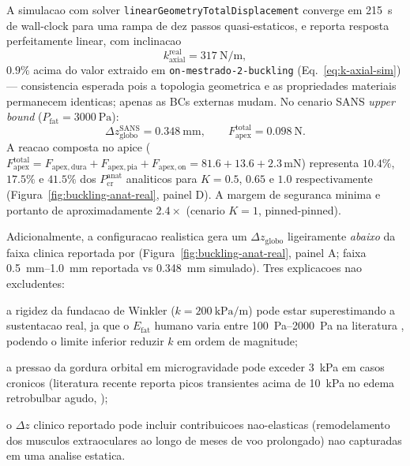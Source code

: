 A simulacao com solver \texttt{linearGeometryTotalDisplacement} converge em \SI{215}{\second} de wall-clock para uma rampa de dez passos quasi-estaticos, e reporta resposta perfeitamente linear, com inclinacao
\begin{equation}
  k_{\mathrm{axial}}^{\mathrm{real}} = \SI{317}{\newton\per\meter},
  \label{eq:k-axial-real}
\end{equation}
$0.9\%$ acima do valor extraido em \texttt{on-mestrado-2-buckling} (Eq.~\ref{eq:k-axial-sim}) --- consistencia esperada pois a topologia geometrica e as propriedades materiais permanecem identicas; apenas as BCs externas mudam. No cenario SANS \emph{upper bound} ($P_{\mathrm{fat}} = \SI{3000}{\pascal}$):
\begin{equation}
  \Delta z_{\mathrm{globo}}^{\mathrm{SANS}} = \SI{0.348}{\milli\meter},
  \qquad
  F_{\mathrm{apex}}^{\mathrm{total}} = \SI{0.098}{\newton}.
  \label{eq:resposta-SANS-real}
\end{equation}
A reacao composta no apice ($F_{\mathrm{apex}}^{\mathrm{total}} = F_{\mathrm{apex,dura}} + F_{\mathrm{apex,pia}} + F_{\mathrm{apex,on}} = 81.6 + 13.6 + 2.3\,\si{\milli\newton}$) representa $10.4\%$, $17.5\%$ e $41.5\%$ dos $P_{\mathrm{cr}}^{\mathrm{anat}}$ analiticos para $K = 0.5$, $0.65$ e $1.0$ respectivamente (Figura~\ref{fig:buckling-anat-real}, painel D). A margem de seguranca minima e portanto de aproximadamente $2.4\times$ (cenario $K = 1$, pinned-pinned).

Adicionalmente, a configuracao realistica gera um $\Delta z_{\mathrm{globo}}$ ligeiramente \emph{abaixo} da faixa clinica reportada por \citet{Lee2020NPJ} (Figura~\ref{fig:buckling-anat-real}, painel A; faixa \SIrange{0.5}{1.0}{\milli\meter} reportada vs \SI{0.348}{\milli\meter} simulado). Tres explicacoes nao excludentes:
\begin{enumerate*}[label=(\roman*)]
\item a rigidez da fundacao de Winkler ($k = \SI{200}{\kilo\pascal\per\meter}$) pode estar superestimando a sustentacao real, ja que o $E_{\mathrm{fat}}$ humano varia entre \SIrange{100}{2000}{\pascal} na literatura \citep{Yoo2011, Hwu2015}, podendo o limite inferior reduzir $k$ em ordem de magnitude;
\item a pressao da gordura orbital em microgravidade pode exceder \SI{3}{\kilo\pascal} em casos cronicos (literatura recente reporta picos transientes acima de \SI{10}{\kilo\pascal} no edema retrobulbar agudo, \citet{Pardon2024});
\item o $\Delta z$ clinico reportado pode incluir contribuicoes nao-elasticas (remodelamento dos musculos extraoculares ao longo de meses de voo prolongado) nao capturadas em uma analise estatica.
\end{enumerate*}

